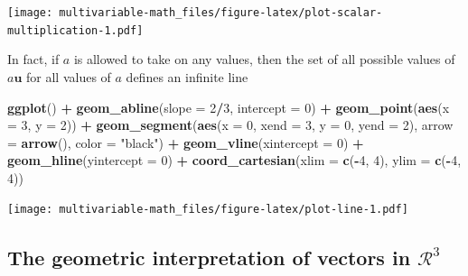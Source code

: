 \documentclass[
]{book}
\newenvironment{Shaded}{\begin{snugshade}}{\end{snugshade}}
\newcommand{\DataTypeTok}[1]{\textcolor[rgb]{0.13,0.29,0.53}{#1}}
\newcommand{\DecValTok}[1]{\textcolor[rgb]{0.00,0.00,0.81}{#1}}
\newcommand{\KeywordTok}[1]{\textcolor[rgb]{0.13,0.29,0.53}{\textbf{#1}}}
\newcommand{\NormalTok}[1]{#1}
\newcommand{\OperatorTok}[1]{\textcolor[rgb]{0.81,0.36,0.00}{\textbf{#1}}}
\newcommand{\StringTok}[1]{\textcolor[rgb]{0.31,0.60,0.02}{#1}}
\theoremstyle{definition}
\theoremstyle{definition}
\theoremstyle{definition}
\theoremstyle{definition}
\theoremstyle{remark}
\begin{document}
\texttt{[image: multivariable-math\_files/figure-latex/plot-scalar-multiplication-1.pdf]}

In fact, if \(a\) is allowed to take on any values, then the set of all possible values of \(a \mathbf{u}\) for all values of \(a\) defines an infinite line

\begin{Shaded}
\begin{Highlighting}[]
\KeywordTok{ggplot}\NormalTok{() }\OperatorTok{+}
\StringTok{    }\KeywordTok{geom_abline}\NormalTok{(}\DataTypeTok{slope =} \DecValTok{2}\OperatorTok{/}\DecValTok{3}\NormalTok{, }\DataTypeTok{intercept =} \DecValTok{0}\NormalTok{) }\OperatorTok{+}\StringTok{  }
\StringTok{    }\KeywordTok{geom_point}\NormalTok{(}\KeywordTok{aes}\NormalTok{(}\DataTypeTok{x =} \DecValTok{3}\NormalTok{, }\DataTypeTok{y =} \DecValTok{2}\NormalTok{)) }\OperatorTok{+}
\StringTok{    }\KeywordTok{geom_segment}\NormalTok{(}\KeywordTok{aes}\NormalTok{(}\DataTypeTok{x =} \DecValTok{0}\NormalTok{, }\DataTypeTok{xend =} \DecValTok{3}\NormalTok{, }\DataTypeTok{y =} \DecValTok{0}\NormalTok{, }\DataTypeTok{yend =} \DecValTok{2}\NormalTok{), }\DataTypeTok{arrow =} \KeywordTok{arrow}\NormalTok{(), }\DataTypeTok{color =} \StringTok{"black"}\NormalTok{) }\OperatorTok{+}
\StringTok{    }\KeywordTok{geom_vline}\NormalTok{(}\DataTypeTok{xintercept =} \DecValTok{0}\NormalTok{) }\OperatorTok{+}\StringTok{ }
\StringTok{    }\KeywordTok{geom_hline}\NormalTok{(}\DataTypeTok{yintercept =} \DecValTok{0}\NormalTok{) }\OperatorTok{+}
\StringTok{    }\KeywordTok{coord_cartesian}\NormalTok{(}\DataTypeTok{xlim =} \KeywordTok{c}\NormalTok{(}\OperatorTok{-}\DecValTok{4}\NormalTok{, }\DecValTok{4}\NormalTok{), }\DataTypeTok{ylim =} \KeywordTok{c}\NormalTok{(}\OperatorTok{-}\DecValTok{4}\NormalTok{, }\DecValTok{4}\NormalTok{)) }
\end{Highlighting}
\end{Shaded}

\texttt{[image: multivariable-math\_files/figure-latex/plot-line-1.pdf]}

\hypertarget{the-geometric-interpretation-of-vectors-in-mathcalr3}{%
\subsection{\texorpdfstring{The geometric interpretation of vectors in \(\mathcal{R}^3\)}{The geometric interpretation of vectors in \textbackslash mathcal\{R\}\^{}3}}\label{the-geometric-interpretation-of-vectors-in-mathcalr3}}
\end{document}
